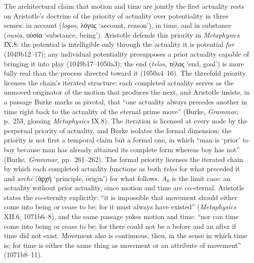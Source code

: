 \documentclass{article}
\newcommand{\gk}[1]{{\greekfont #1}}
\begin{document}
The architectural claim that motion and time are jointly the first actuality rests on Aristotle's doctrine of the priority of actuality over potentiality in three senses: in account (\textit{logos}, \gk{λόγος} `account, reason'), in time, and in substance (\textit{ousia}, \gk{οὐσία} `substance, being'). Aristotle defends this priority in \textit{Metaphysics} IX.8: the potential is intelligible only through the actuality it is potential \textit{for} (1049b12--17); any individual potentiality presupposes a prior actuality capable of bringing it into play (1049b17--1050a3); the end (\textit{telos}, \gk{τέλος} `end, goal') is more fully real than the process directed toward it (1050a4--16). The threefold priority licenses the chain's iterated structure: each completed actuality serves as the unmoved originator of the motion that produces the next, and Aristotle insists, in a passage Burke marks as pivotal, that ``one actuality always precedes another in time right back to the actuality of the eternal prime move'' (Burke, \textit{Grammar}, p.~253, glossing \textit{Metaphysics} IX.8). The iteration is licensed at every node by the perpetual priority of actuality, and Burke isolates the formal dimension: the priority is not first a temporal claim but a formal one, in which ``man is `prior' to boy because man has already attained its complete form whereas boy has not'' (Burke, \textit{Grammar}, pp.~261--262). The formal priority licenses the iterated chain by which each completed actuality functions as both \textit{telos} for what preceded it and \textit{archē} (\gk{ἀρχή} `principle, origin') for what follows. $A_0$ is the limit case: an actuality without prior actuality, since motion and time are co-eternal. Aristotle states the co-eternity explicitly: ``it is impossible that movement should either come into being or cease to be; for it must always have existed'' (\textit{Metaphysics} XII.6, 1071b6--8), and the same passage yokes motion and time: ``nor can time come into being or cease to be; for there could not be a before and an after if time did not exist. Movement also is continuous, then, in the sense in which time is; for time is either the same thing as movement or an attribute of movement'' (1071b8--11).
\end{document}
